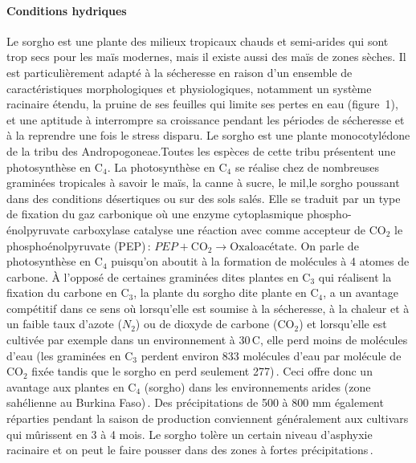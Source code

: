 \documentclass[a4paper,11pt]{article}
\begin{document}
\paragraph{Conditions hydriques} Le sorgho est une plante des milieux
tropicaux chauds et semi-arides qui sont trop secs pour les maïs
modernes, mais il existe aussi des maïs de zones sèches. Il est
particulièrement adapté à la sécheresse en raison d'un ensemble de
caractéristiques morphologiques et physiologiques, notamment un
système racinaire étendu, la pruine de ses feuilles qui limite ses
pertes en eau (figure~1), et une aptitude à interrompre sa croissance
pendant les périodes de sécheresse et à la reprendre une fois le
stress disparu. Le sorgho est une plante monocotylédone de la tribu
des Andropogoneae.Toutes les espèces de cette tribu présentent une
photosynthèse en $\text{C}_4$. La photosynthèse en $\text{C}_4$ se
réalise chez de nombreuses graminées tropicales à savoir le maïs, la
canne à sucre, le mil,le sorgho poussant dans des conditions
désertiques ou sur des sols salés. Elle se traduit par un type de
fixation du gaz carbonique où une enzyme cytoplasmique
phospho-énolpyruvate carboxylase catalyse une réaction avec comme
accepteur de $\text{CO}_2$ le phosphoénolpyruvate (PEP)\,:
$PEP + \text{CO}_2 \longrightarrow \text{Oxaloacétate}$. On parle de
photosynthèse en $\text{C}_4$ puisqu'on aboutit à la formation de
molécules à 4 atomes de carbone. À l'opposé de certaines graminées
dites plantes en $\text{C}_3$ qui réalisent la fixation du carbone en
$\text{C}_3$, la plante du sorgho dite plante en $\text{C}_4$, a un
avantage compétitif dans ce sens où lorsqu'elle est soumise à la
sécheresse, à la chaleur et à un faible taux d'azote ($N_2$) ou de
dioxyde de carbone ($\text{CO}_2$) et lorsqu'elle est cultivée par
exemple dans un environnement à 30\,\degree{}C, elle perd moins de
molécules d'eau (les graminées en $\text{C}_3$ perdent environ 833
molécules d'eau par molécule de $\text{CO}_2$ fixée tandis que le
sorgho en perd seulement 277)\,\cite{sage1998c4}. Ceci offre donc un
avantage aux plantes en $\text{C}_4$ (sorgho) dans les environnements
arides (zone sahélienne au Burkina Faso)\,\cite{sage1998c4}. Des
 précipitations de 500 à 800 mm également réparties pendant la saison
 de production conviennent généralement aux cultivars qui mûrissent
 en 3 à 4 mois. Le sorgho tolère un certain niveau d'asphyxie
 racinaire et on peut le faire pousser dans des zones à fortes
 précipitations\,\cite{BARRO_KONDOMBO_2010}.

 
\end{document}
